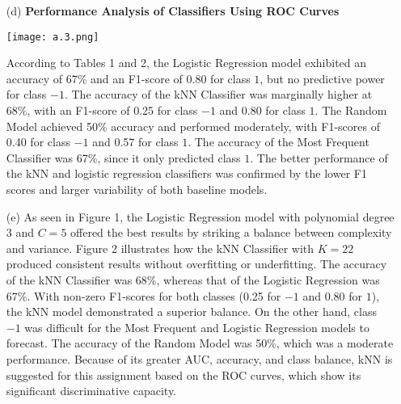 \documentclass[a4paper,10pt]{article}
\begin{document}
\begin{enumerate}
\newpage
\item[(d)] \textbf{Performance Analysis of Classifiers Using ROC Curves}
 \begin{center}
        \centering
        \texttt{[image: a.3.png]}
        \label{}
    \end{center}
    According to Tables 1 and 2, the Logistic Regression model exhibited an accuracy of 67\% and an F1-score of 0.80 for class $1$, but no predictive power for class $-1$. The accuracy of the kNN Classifier was marginally higher at 68\%, with an F1-score of 0.25 for class $-1$ and 0.80 for class $1$. The Random Model achieved 50\% accuracy and performed moderately, with F1-scores of 0.40 for class $-1$ and 0.57 for class $1$. The accuracy of the Most Frequent Classifier was 67\%, since it only predicted class $1$. The better performance of the kNN and logistic regression classifiers was confirmed by the lower F1 scores and larger variability of both baseline models.

\item[(e)]
As seen in Figure 1, the Logistic Regression model with polynomial degree 3 and $C = 5$ offered the best results by striking a balance between complexity and variance. Figure 2 illustrates how the kNN Classifier with $K = 22$ produced consistent results without overfitting or underfitting. The accuracy of the kNN Classifier was 68\%, whereas that of the Logistic Regression was 67\%. With non-zero F1-scores for both classes (0.25 for $-1$ and 0.80 for $1$), the kNN model demonstrated a superior balance. On the other hand, class $-1$ was difficult for the Most Frequent and Logistic Regression models to forecast. The accuracy of the Random Model was 50\%, which was a moderate performance. Because of its greater AUC, accuracy, and class balance, kNN is suggested for this assignment based on the ROC curves, which show its significant discriminative capacity. 
\end{enumerate}
\end{document}
